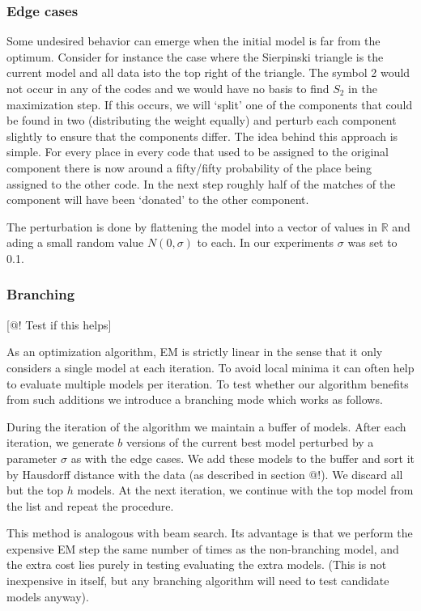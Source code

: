 \documentclass[11pt, twocolumn]{article}
\theoremstyle{definition}
\begin{document}
\subsubsection{Edge cases}

Some undesired behavior can emerge when the initial model is far from the optimum. Consider for instance the case where the Sierpinski triangle is the current model and all data isto the top right of the triangle. The symbol 2 would not occur in any of the codes and we would have no basis to find $S_2$ in the maximization step. If this occurs, we will `split' one of the components that could be found in two (distributing the weight equally) and perturb each component slightly to ensure that the components differ. The idea behind this approach is simple. For every place in every code that used to be assigned to the original component there is now around a fifty/fifty probability of the place being assigned to the other code. In the next step roughly half of the matches of the component will have been `donated' to the other component.

The perturbation is done by flattening the model into a vector of values in ${\mathbb R}$ and ading a small random value $N(0, \sigma)$ to each. In our experiments $\sigma$ was set to 0.1.

\subsubsection{Branching}

[@! Test if this helps]

As an optimization algorithm, EM is strictly linear in the sense that it only considers a single model at each iteration. To avoid local minima it can often help to evaluate multiple models per iteration. To test whether our algorithm benefits from such additions we introduce a branching mode which works as follows.

During the iteration of the algorithm we maintain a buffer of models. After each iteration, we generate $b$ versions of the current best model perturbed by a parameter $\sigma$ as with the edge cases. We add these models to the buffer and sort it by Hausdorff distance with the data (as described in section @!). We discard all but the top $h$ models. At the next iteration, we continue with the top model from the list and repeat the procedure.

This method is analogous with beam search. Its advantage is that we perform the expensive EM step the same number of times as the non-branching model, and the extra cost lies purely in testing evaluating the extra models. (This is not inexpensive in itself, but any branching algorithm will need to test candidate models anyway).
\end{document}
